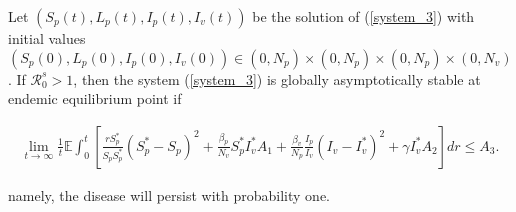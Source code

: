 \begin{theorem}\label{theorem_3}
	Let $(S_p(t),L_p(t),I_p(t),I_v(t))$ be the solution of (\ref{system_3}) with initial values $(S_p(0),L_p(0),I_p(0),I_v(0))\in (0,N_p)\times(0,N_p)\times(0,N_p)\times(0,N_v)$. If $\mathcal{R}^s_0>1$, then the system (\ref{system_3}) is globally asymptotically stable at endemic equilibrium point if
	
	\begin{align*}
		\lim\limits_{t\rightarrow \infty}\frac{1}{t}\mathbb{E}\int_{0}^{t}\left[\frac{rS_p^*}{S_pS_p^*}(S_p^*-S_p)^2+\frac{\beta_p}{N_v}S_p^*I_v^*A_1+\frac{\beta_v}{N_p}\frac{I_p}{I_v}(I_v-I_v^*)^2+\gamma I_v^*A_2\right]dr\leq A_3.
	\end{align*}
	
	namely, the disease will persist with probability one.
\end{theorem}
